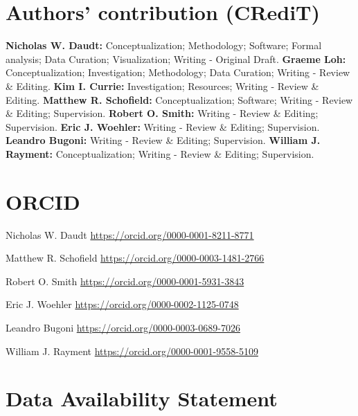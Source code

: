 \documentclass[preprint, 3p, authoryear]{elsarticle} %
\begin{document}




\newpage

\hypertarget{authors-contribution-credit}{%
\section*{Authors' contribution (CRediT)}\label{authors-contribution-credit}}

\textbf{Nicholas W. Daudt:} Conceptualization; Methodology; Software; Formal analysis; Data Curation; Visualization; Writing - Original Draft. \textbf{Graeme Loh:} Conceptualization; Investigation; Methodology; Data Curation; Writing - Review \& Editing. \textbf{Kim I. Currie:} Investigation; Resources; Writing - Review \& Editing. \textbf{Matthew R. Schofield:} Conceptualization; Software; Writing - Review \& Editing; Supervision. \textbf{Robert O. Smith:} Writing - Review \& Editing; Supervision. \textbf{Eric J. Woehler:} Writing - Review \& Editing; Supervision. \textbf{Leandro Bugoni:} Writing - Review \& Editing; Supervision. \textbf{William J. Rayment:} Conceptualization; Writing - Review \& Editing; Supervision.

\hypertarget{orcid}{%
\section*{ORCID}\label{orcid}}

Nicholas W. Daudt \url{https://orcid.org/0000-0001-8211-8771}

Matthew R. Schofield \url{https://orcid.org/0000-0003-1481-2766}

Robert O. Smith \url{https://orcid.org/0000-0001-5931-3843}

Eric J. Woehler \url{https://orcid.org/0000-0002-1125-0748}

Leandro Bugoni \url{https://orcid.org/0000-0003-0689-7026}

William J. Rayment \url{https://orcid.org/0000-0001-9558-5109}


\hypertarget{data-availability-statement}{%
\section*{Data Availability Statement}\label{data-availability-statement}}
\end{document}
